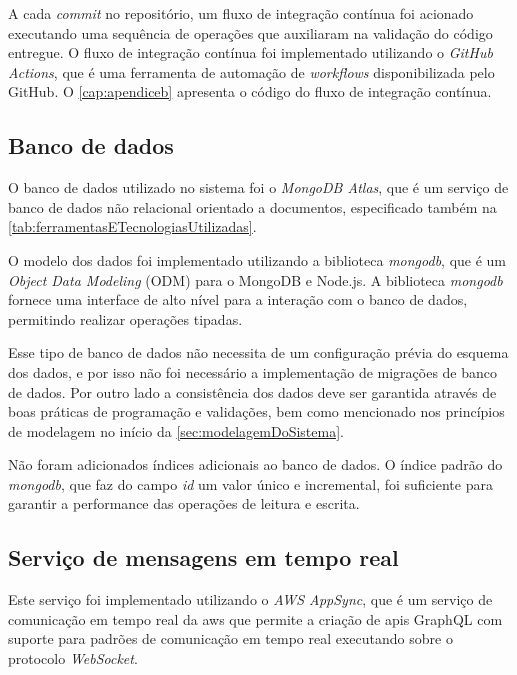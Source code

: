 \hfill\break

A cada \textit{commit} no repositório, um fluxo de integração contínua foi acionado executando uma sequência de operações que auxiliaram na validação do código entregue. O fluxo de integração contínua foi implementado utilizando o \textit{GitHub Actions}, que é uma ferramenta de automação de \textit{workflows} disponibilizada pelo GitHub. O \autoref{cap:apendiceb} apresenta o código do fluxo de integração contínua.

\subsection{Banco de dados}
\label{subsec:bancoDeDados}

O banco de dados utilizado no sistema foi o \textit{MongoDB Atlas}, que é um serviço de banco de dados não relacional orientado a documentos, especificado também na \autoref{tab:ferramentasETecnologiasUtilizadas}.

O modelo dos dados foi implementado utilizando a biblioteca \textit{mongodb}, que é um \textit{Object Data Modeling} (ODM) para o MongoDB e Node.js. A biblioteca \textit{mongodb} fornece uma interface de alto nível para a interação com o banco de dados, permitindo realizar operações tipadas.

Esse tipo de banco de dados não necessita de um configuração prévia do esquema dos dados, e por isso não foi necessário a implementação de migrações de banco de dados. Por outro lado a consistência dos dados deve ser garantida através de boas práticas de programação e validações, bem como mencionado nos princípios de modelagem no início da \autoref{sec:modelagemDoSistema}.

Não foram adicionados índices adicionais ao banco de dados. O índice padrão do \textit{mongodb}, que faz do campo \textit{id} um valor único e incremental, foi suficiente para garantir a performance das operações de leitura e escrita.

\subsection{Serviço de mensagens em tempo real}
\label{subsec:servicoDeMensagensEmTempoReal}

Este serviço foi implementado utilizando o \textit{AWS AppSync}, que é um serviço de comunicação em tempo real da \gls{aws} que permite a criação de \glspl{api} GraphQL com suporte para padrões de comunicação em tempo real executando sobre o protocolo \textit{WebSocket}.

